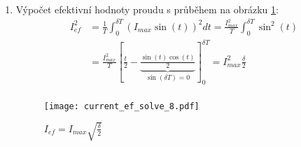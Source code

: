 \begin{enumerate}[noitemsep]
      \item Výpočet efektivní hodnoty proudu s průběhem na obrázku \ref{es:fig_current_ef_solve_8}:
        {\footnotesize
          \begin{align*}
            I_{ef}^2 
              &=  \frac{1}{T}\int_0^{\delta T}{\left(I_{max}\sin(t)\right)^2}dt=
                  \frac{I_{max}^2}{T}\int_0^{\delta T}{\sin^2(t)}                          \\ 
              &=  \frac{I_{max}^2}{T}\left[\frac{t}{2}-
                  \underbrace{\frac{\sin(t)\cos(t)}{2}}_{\sin(\delta T)=0}\right]_0^{\delta T}
                  = I_{max}^2\frac{\delta}{2}                                              \\
          \end{align*}
         } %
        \begin{figure}[ht!]
          \centering
          \texttt{[image: current\_ef\_solve\_8.pdf]}
          \caption{\(I_{ef} = I_{max}\sqrt{\frac{\delta}{2}}\)}
          \label{es:fig_current_ef_solve_8}
        \end{figure}

    \end{enumerate}

